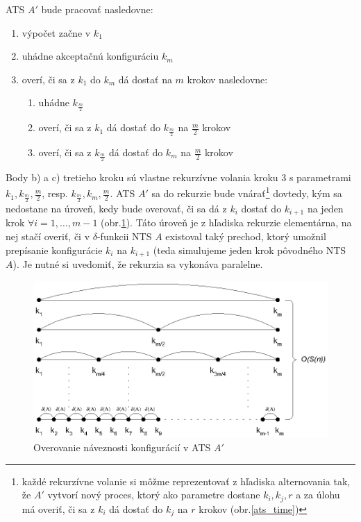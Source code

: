 \begin{dokaz}
  \smallskip
  ATS $A'$ bude pracovať nasledovne:
  \begin{enumerate}
    \item výpočet začne v $k_1$
    \item uhádne akceptačnú konfiguráciu $k_m$
    \item overí, či sa z $k_1$ do $k_m$ dá dostať na $m$ krokov
      nasledovne:
      \begin{enumerate}
        \item uhádne $k_{\frac{m}{2}}$
        \item overí, či sa z $k_1$ dá dostať do $k_{\frac{m}{2}}$ na $\frac{m}{2}$
        krokov
        \item overí, či sa z $k_{\frac{m}{2}}$ dá dostať do $k_m$ na $\frac{m}{2}$
        krokov
      \end{enumerate}
  \end{enumerate}
  Body b) a c) tretieho kroku sú vlastne rekurzívne volania kroku 3
  s parametrami $k_1,k_{\frac{m}{2}},\frac{m}{2}$, resp.
  $k_{\frac{m}{2}},k_m,\frac{m}{2}$. ATS $A'$ sa do rekurzie bude
  vnárať\footnote{každé rekurzívne volanie si môžme reprezentovať z
  hľadiska alternovania tak, že $A'$ vytvorí nový proces, ktorý ako
  parametre dostane $k_i,k_j,r$ a za úlohu má overiť, či sa z $k_i$
  dá dostať do $k_j$ na $r$ krokov (obr.\ref{ats_time})} dovtedy,
  kým sa nedostane na úroveň, kedy bude overovať, či sa dá z $k_i$
  dostať do $k_{i+1}$ na jeden krok $\forall i=1,\dots,m-1$
  (obr.\ref{aspace1}). Táto úroveň je z hľadiska rekurzie
  elementárna, na nej stačí overiť, či v $\delta$-funkcii NTS $A$
  existoval taký prechod, ktorý umožnil prepísanie konfigurácie
  $k_i$ na $k_{i+1}$ (teda simulujeme jeden krok pôvodného NTS $A$).
  Je nutné si uvedomiť, že rekurzia sa vykonáva paralelne.

  \begin{figure}[!ht]
    \centering
    \includegraphics{img/aspace1}
    \caption{Overovanie náveznosti konfigurácií v ATS $A'$}
    \label{aspace1}
  \end{figure}


\end{dokaz}
